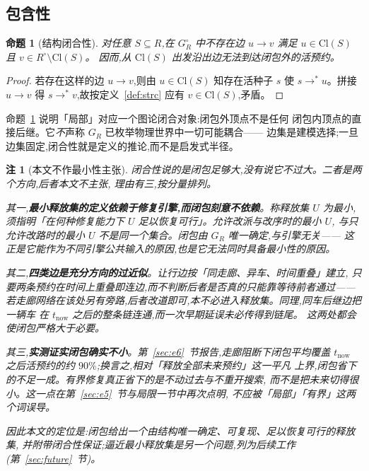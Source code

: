 \documentclass[manuscript,screen,review]{acmart}
\newtheorem{remark}{注}
\newtheorem{prop}{命题}
\begin{document}
\subsection{包含性}
\label{sec:containment}

\begin{prop}[结构闭合性]
\label{prop:struct}
对任意 \(S\subseteq R\),在 \(G_R^\circ\) 中不存在边
\(u\to v\) 满足 \(u\in\mathrm{Cl}(S)\) 且 \(v\in R^{\circ}\setminus\mathrm{Cl}(S)\)。
因而,从 \(\mathrm{Cl}(S)\) 出发沿出边无法到达闭包外的活预约。
\end{prop}

\begin{proof}
若存在这样的边 \(u\to v\),则由 \(u\in\mathrm{Cl}(S)\) 知存在活种子 \(s\) 使
\(s\to^* u\)。拼接 \(u\to v\) 得 \(s\to^* v\),故按定义~\ref{def:strc} 应有
\(v\in\mathrm{Cl}(S)\),矛盾。
\end{proof}

命题~\ref{prop:struct} 说明「局部」对应一个图论闭合对象:闭包外顶点不是任何
闭包内顶点的直接后继。它\emph{不}声称 \(G_R\) 已枚举物理世界中一切可能耦合——
边集是建模选择;一旦边集固定,闭合性就是定义的推论,而不是启发式半径。

\begin{remark}[本文不作最小性主张]
\label{rem:minimality}
闭合性说的是闭包\emph{足够大},没有说它\emph{不过大}。二者是两个方向,后者本文不主张,
理由有三,按分量排列。

其一,\textbf{最小释放集的定义依赖于修复引擎,而闭包刻意不依赖}。称释放集 \(U\) 为最小,
须指明「在何种修复能力下 \(U\) 足以恢复可行」。允许改派与改序时的最小 \(U\),
与只允许改路时的最小 \(U\) 不是同一个集合。闭包由 \(G_R\) 唯一确定,与引擎无关——
这正是它能作为不同引擎公共输入的原因,也是它无法同时具备最小性的原因。

其二,\textbf{四类边是充分方向的过近似}。让行边按「同走廊、异车、时间重叠」建立,
只要两条预约在时间上重叠即连边,而不判断后者是否\emph{真的}只能靠等待前者通过——
若走廊网络在该处另有旁路,后者改道即可,本不必进入释放集。同理,同车后继边把一辆车
在 \(t_{\mathrm{now}}\) 之后的整条链连通,而一次早期延误未必传得到链尾。
这两处都会使闭包严格大于必要。

其三,\textbf{实测证实闭包确实不小}。第~\ref{sec:e6}~节报告,走廊阻断下闭包平均覆盖
\(t_{\mathrm{now}}\) 之后活预约的约 \(90\%\);换言之,相对「释放全部未来预约」这一平凡
上界,闭包省下的不足一成。有界修复真正省下的是\emph{不动过去}与\emph{不重开搜索},
而不是把未来切得很小。这一点在第~\ref{sec:e5}~节与局限一节中再次点明,
不应被「局部」「有界」这两个词误导。

因此本文的定位是:闭包给出一个由结构唯一确定、可复现、\emph{足以}恢复可行的释放集,
并附带闭合性保证;逼近最小释放集是另一个问题,列为后续工作
(第~\ref{sec:future}~节)。
\end{remark}
\end{document}
